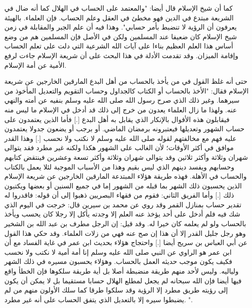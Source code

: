 كما أن شيخ الإسلام قال أيضا: "والمعتمد على الحساب في الهلال كما أنه ضال في الشريعة مبتدع في الدين فهو مخطئ في العقل وعلم الحساب. فإن العلماء. بالهيئة يعرفون أن الرؤية لا تنضبط بأمر حسابي". وهذا فيه أن علم الجبر والمقابلة في زمن شيخ الإسلام كان ضعيفا عند المسلمين ولكن في الأصل فإن المسلمين هم من وضع أساس هذا العلم العظيم بناءا على آيات الله الشرعية التي دلت على تعلم الحساب وإقامة الميزان. وقد تقدمت الأدلة في هذا البحث على أن شريعة الإسلام جاءت لرفع الأمية عن أمة الإسلام. 


حتى أنه غلظ القول في من يأخذ بالحساب من أهل البدع المارقين الخارجين عن شريعة الإسلام فقال: "الأخذ بالحساب أو الكتاب كالجداول وحساب التقويم والتعديل المأخوذ من سيرهما. وغير ذلك الذي صرح رسول الله صلى الله عليه وسلم بنفيه عن أمته والنهي عنه. ولهذا ما زال العلماء يعدون من خرج إلى ذلك قد أدخل في الإسلام ما ليس منه فيقابلون هذه الأقوال بالإنكار الذي يقابل به أهل البدع [.] فأما الذين يعتمدون على حساب الشهور وتعديلها فيعتبرونه برمضان الماضي. أو برجب أو يضعون جدولا يعتمدون عليه فهم مع مخالفتهم لقوله صلى الله عليه وسلم {لا نكتب ولا نحسب} [.] وهذا القدر موافق في أكثر الأوقات؛ لأن الغالب على الشهور هكذا ولكنه غير مطرد فقد يتوالى شهران وثلاثة وأكثر ثلاثين وقد يتوالى شهران وثلاثة وأكثر تسعة وعشرين فينتقض كتابهم وحسابهم ويفسد دينهم الذي ليس بقيم وهذا من الأسباب الموجبة لئلا يعمل بالكتاب والحساب في الأهلة. فهذه طريقة هؤلاء المبتدعة المارقين الخارجين عن شريعة الإسلام الذين يحسبون ذلك الشهر بما قبله من الشهور إما في جميع السنين أو بعضها ويكتبون ذلك [.] وأما الفريق الثاني: فقوم من فقهاء البصريين ذهبوا إلى أن قوله: {فاقدروا له} تقدير حساب بمنازل القمر وقد روي عن محمد بن سيرين قال: خرجت في اليوم الذي شك فيه فلم أدخل على أحد يؤخذ عنه العلم إلا وجدته يأكل إلا رجلا كان يحسب ويأخذ بالحساب ولو لم يعلمه كان خيرا له. وقد قيل: إن الرجل مطرف بن عبد الله بن الشخير وهو رجل جليل القدر إلا أن هذا إن صح عنه فهي من زلات العلماء. وقد حكي هذا القول عن أبي العباس بن سريج أيضا [.] واحتجاج هؤلاء بحديث ابن عمر في غاية الفساد مع أن ابن عمر هو الراوي عن النبي صلى الله عليه وسلم {إنا أمة أمية لا نكتب ولا نحسب} فكيف يكون موجب حديثه العمل بالحساب. وهؤلاء يحسبون مسيره في ذلك الشهر ولياليه. وليس لأحد منهم طريقة منضبطة أصلا بل أية طريقة سلكوها فإن الخطأ واقع فيها أيضا فإن الله سبحانه لم يجعل لمطلع الهلال حسابا مستقيما بل لا يمكن أن يكون إلى رؤيته طريق مطرد إلا الرؤية وقد سلكوا طرقا كما سلك الأولون منهم من لم يضبطوا سيره إلا بالتعديل الذي يتفق الحساب على أنه غير مطرد.
". 



